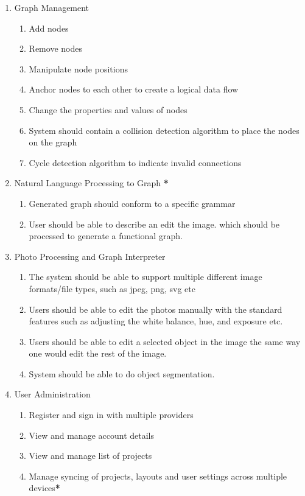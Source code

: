 \documentclass[11pt,a4paper]{article}
\begin{document}
\begin{enumerate}[label=\arabic*.]
    \item Graph Management
    \begin{enumerate}[label*=\arabic*.]
        \item Add nodes
        \item Remove nodes
        \item Manipulate node positions
        \item Anchor nodes to each other to create a logical data flow
        \item Change the properties and values of nodes
        \item System should contain a collision detection algorithm to
        place the nodes on the graph
        \item Cycle detection algorithm to indicate invalid connections
    \end{enumerate}
    
    \item Natural Language Processing to Graph \textbf{*}
    \begin{enumerate}[label*=\arabic*.]
        \item Generated graph should conform to a specific grammar
        \item User should be able to describe an edit the image.
        which should be processed to generate a functional graph.
    \end{enumerate}
    
    \item Photo Processing and Graph Interpreter
    \begin{enumerate}[label*=\arabic*.]
        \item The system should be able to support multiple different image formats/file
        types, such as jpeg, png, svg etc 
        \item Users should be able to edit the photos manually with the standard 
        features such as adjusting the white balance, hue, and exposure etc. 
        \item Users should be able to edit a selected object in the image the 
        same way one would edit the rest of the image. 
        \item System should be able to do object segmentation.
    \end{enumerate}

    \item User Administration
    \begin{enumerate}[label*=\arabic*.]
	\item Register and sign in with multiple providers
	\item View and manage account details
	\item View and manage list of projects
	\item Manage syncing of projects, layouts and user settings across multiple
	devices\textbf{*}
    \end{enumerate}
\end{enumerate}
\end{document}
